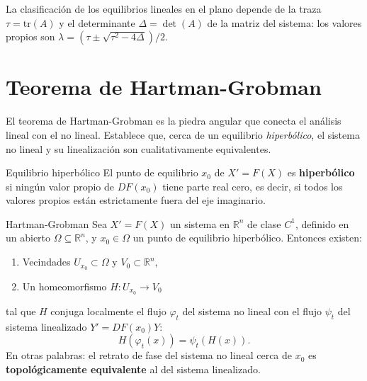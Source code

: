 \documentclass[11pt,letterpaper]{article}
\begin{document}
La clasificación de los equilibrios lineales en el plano depende de la traza
$\tau=\text{tr}(A)$ y el determinante $\Delta=\det(A)$ de la matriz del sistema:
los valores propios son $\lambda=(\tau\pm\sqrt{\tau^2-4\Delta})/2$.

\section{Teorema de Hartman-Grobman}
\label{sec:hartman-grobman}

El teorema de Hartman-Grobman es la piedra angular que conecta el análisis lineal
con el no lineal. Establece que, cerca de un equilibrio \emph{hiperbólico}, el
sistema no lineal y su linealización son cualitativamente equivalentes.

\begin{definicion}{Equilibrio hiperbólico}{}
El punto de equilibrio $x_0$ de $X'=F(X)$ es \textbf{hiperbólico} si ningún
valor propio de $DF(x_0)$ tiene parte real cero, es decir, si todos los
valores propios están estrictamente fuera del eje imaginario.
\end{definicion}

\begin{teorema}{Hartman-Grobman}{}
Sea $X'=F(X)$ un sistema en $\mathbb{R}^n$ de clase $C^1$, definido en un
abierto $\Omega\subseteq\mathbb{R}^n$, y $x_0\in\Omega$ un punto de equilibrio
hiperbólico. Entonces existen:
\begin{enumerate}[label=(\roman*)]
    \item Vecindades $U_{x_0}\subset\Omega$ y $V_0\subset\mathbb{R}^n$,
    \item Un homeomorfismo $H:U_{x_0}\to V_0$
\end{enumerate}
tal que $H$ conjuga localmente el flujo $\varphi_t$ del sistema no lineal con
el flujo $\psi_t$ del sistema linealizado $Y'=DF(x_0)Y$:
\[
H(\varphi_t(x))=\psi_t(H(x)).
\]
En otras palabras: el retrato de fase del sistema no lineal cerca de $x_0$ es
\textbf{topológicamente equivalente} al del sistema linealizado.
\end{teorema}
\end{document}
